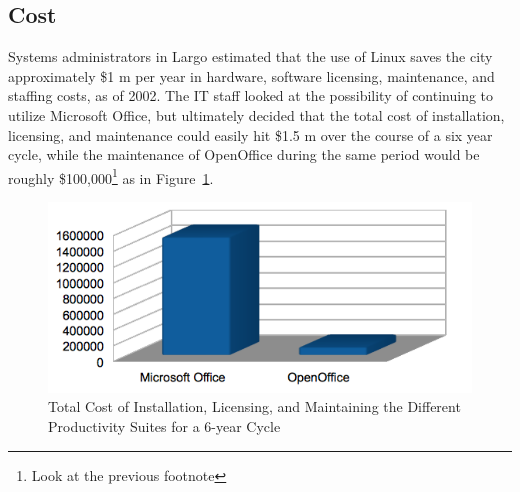 \subsection{Cost}
Systems administrators in Largo estimated that the use of Linux saves the city approximately \$1 m per year in hardware, software licensing, maintenance, and staffing costs, as of 2002. The IT staff looked at the possibility of continuing to utilize Microsoft Office, but ultimately decided that the total cost of installation, licensing, and maintenance could easily hit \$1.5 m over the course of a six year cycle, while the maintenance of OpenOffice during the same period would be roughly \$100,000\footnote{Look at the previous footnote} as in Figure~\ref{fig:Largo_cost}. 
\begin{figure}
\centering
    \includegraphics[scale=0.9]{img/largocost.png}   
 \caption[Largo Office Cost ]{Total Cost of Installation, Licensing, and Maintaining the Different Productivity Suites for a 6-year Cycle}
    \label {fig:Largo_cost}
\end{figure}


